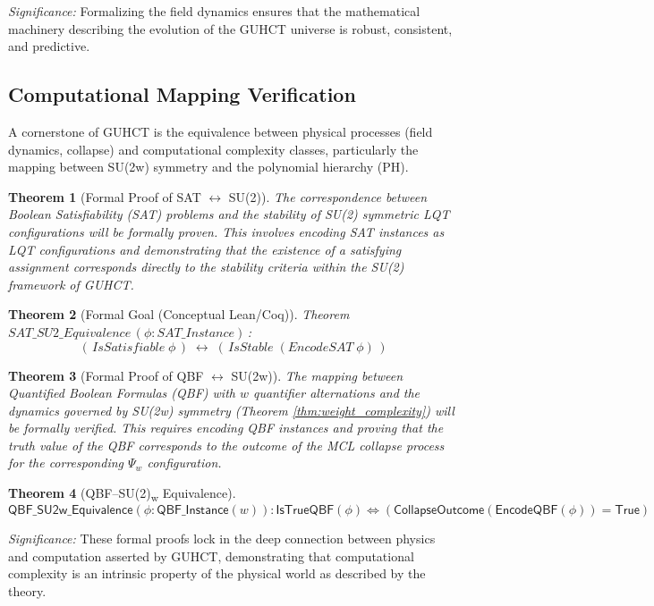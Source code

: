 \documentclass[11pt,a4paper]{article}
\newtheorem{theorem}{Theorem}[section]
\begin{document}
\textit{Significance:} Formalizing the field dynamics ensures that the mathematical machinery describing the evolution of the GUHCT universe is robust, consistent, and predictive.

\subsection{Computational Mapping Verification}
\label{subsec:computational_mapping_formalization}

A cornerstone of GUHCT is the equivalence between physical processes (field dynamics, collapse) and computational complexity classes, particularly the mapping between SU(2w) symmetry and the polynomial hierarchy (PH).

\begin{theorem}[Formal Proof of SAT $\leftrightarrow$ SU(2)]
The correspondence between Boolean Satisfiability (SAT) problems and the stability of SU(2) symmetric LQT configurations will be formally proven. This involves encoding SAT instances as LQT configurations and demonstrating that the existence of a satisfying assignment corresponds directly to the stability criteria within the SU(2) framework of GUHCT.
\end{theorem}
\begin{theorem}[Formal Goal (Conceptual Lean/Coq)]
Theorem $SAT\_SU2\_Equivalence$ $(\phi : SAT\_Instance)$ :
\[
  (\,IsSatisfiable\;\phi\,)
  \;\longleftrightarrow\;
  (\,IsStable\;(EncodeSAT\;\phi)\,)
\]
\end{theorem}


\begin{theorem}[Formal Proof of QBF $\leftrightarrow$ SU(2w)]
The mapping between Quantified Boolean Formulas (QBF) with $w$ quantifier alternations and the dynamics governed by SU(2w) symmetry (Theorem \ref{thm:weight_complexity}) will be formally verified. This requires encoding QBF instances and proving that the truth value of the QBF corresponds to the outcome of the MCL collapse process for the corresponding $\Psi_w$ configuration.
\end{theorem}
\begin{theorem}[QBF–SU(2)\textsubscript{w} Equivalence]
\[
\textsf{QBF\_SU2w\_Equivalence}(\phi : \textsf{QBF\_Instance}(w)) :
\textsf{IsTrueQBF}(\phi) \Leftrightarrow \left( \textsf{CollapseOutcome}(\textsf{EncodeQBF}(\phi)) = \textsf{True} \right)
\]
\end{theorem}


\textit{Significance:} These formal proofs lock in the deep connection between physics and computation asserted by GUHCT, demonstrating that computational complexity is an intrinsic property of the physical world as described by the theory.
\end{document}
